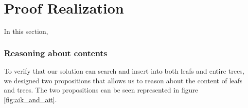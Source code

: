 \section{Proof Realization}
\label{sec:ProofRealization}
In this section, 


\subsubsection{Reasoning about contents}
To verify that our solution can search and insert into both leafs and entire trees, we designed two propositions that allows us to reason about the content of leafs and trees. The two propositions can be seen represented in figure \ref{fig:aik_and_ait}. 

